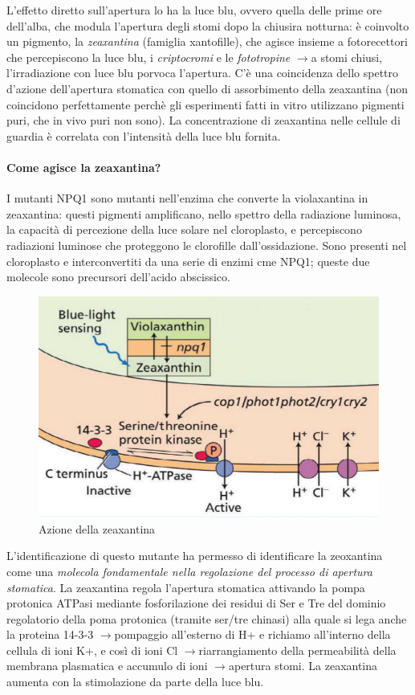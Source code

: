 \documentclass[a4paper,12pt]{book}
\newcommand{\lfreccia}{\ensuremath{\longrightarrow}}
\begin{document}
L'effetto diretto sull'apertura lo ha la luce blu, ovvero quella delle prime ore dell'alba, che modula l'apertura degli stomi dopo la chiusira notturna: è coinvolto un pigmento, la \emph{zeaxantina} (famiglia xantofille), che agisce insieme a fotorecettori che percepiscono la luce blu, i \emph{criptocromi} e le \emph{fototropine} \lfreccia a stomi chiusi, l'irradiazione con luce blu porvoca l'apertura. C'è una coincidenza dello spettro d'azione dell'apertura stomatica con quello di assorbimento della zeaxantina (non coincidono perfettamente perchè gli esperimenti fatti in vitro utilizzano pigmenti puri, che in vivo puri non sono).
La concentrazione di zeaxantina nelle cellule di guardia è correlata con l'intensità della luce blu fornita.

\paragraph{Come agisce la zeaxantina?}
I mutanti NPQ1 sono mutanti nell'enzima che converte la violaxantina in zeaxantina: questi pigmenti amplificano, nello spettro della radiazione luminosa, la capacità di percezione della luce solare nel cloroplasto, e percepiscono radiazioni luminose che proteggono le clorofille dall'ossidazione. Sono presenti nel cloroplasto e interconvertiti da una serie di enzimi cme NPQ1; queste due molecole sono precursori dell'acido abscissico. 
\begin{figure}[H]
\centering
\includegraphics[scale=0.4]{immagini/zea.jpg}
\caption{Azione della zeaxantina}
\end{figure}

L'identificazione di questo mutante ha permesso di identificare la zeoxantina come una \emph{molecola fondamentale nella regolazione del processo di apertura stomatica}.
La zeaxantina regola l'apertura stomatica attivando la pompa protonica ATPasi mediante fosforilazione dei residui di Ser e Tre del dominio regolatorio della poma protonica (tramite ser/tre chinasi) alla quale si lega anche la proteina 14-3-3 \lfreccia pompaggio all'esterno di H+ e richiamo all'interno della cellula di ioni K+, e così di ioni Cl \lfreccia riarrangiamento della permeabilità della membrana plasmatica e accumulo di ioni \lfreccia apertura stomi.
La zeaxantina aumenta con la stimolazione da parte della luce blu.
\end{document}
